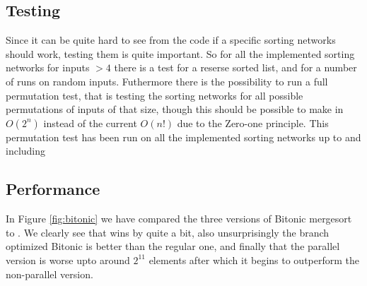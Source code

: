 \subsection{Testing}
Since it can be quite hard to see from the code if a specific sorting networks
should work, testing them is quite important. So for all the implemented
sorting networks for inputs $>4$ there is a test for a reserse sorted list, and
for a number of runs on random inputs. Futhermore there is the possibility to
run a full permutation test, that is testing the sorting networks for all
possible permutations of inputs of that size, though this should be possible to
make in $O(2^n)$ instead of the current $O(n!)$ due to the Zero-one principle.
This permutation test has been run on all the implemented sorting networks up
to and including 

\subsection{Performance}
In Figure \ref{fig:bitonic} we have compared the three versions of Bitonic
mergesort to . We clearly see that  wins by
quite a bit, also unsurprisingly the branch optimized Bitonic is better than
the regular one, and finally that the parallel version is worse upto around
$2^{11}$ elements after which it begins to outperform the non-parallel version.

